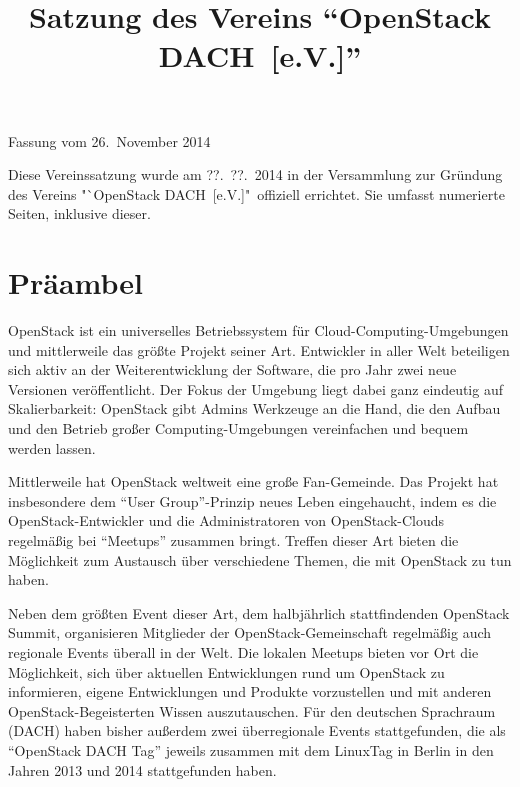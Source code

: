 \documentclass[draft]{scrartcl}
\newcommand{\VereinsName}{OpenStack DACH}
\begin{document}

\title{Satzung des Vereins "`\VereinsName\ [e.V.]"'}
\date{}
\author{}
\def\fassungsdatum{26.\ November 2014}

\begin{center}
  \LARGE \thetitle
\end{center}

\begin{flushright}
  Fassung vom \fassungsdatum
\end{flushright}

\pagestyle{scrheadings}
\clearscrheadfoot
{}

{\footnotesize Diese Vereinssatzung wurde am ??.\ ??.\ 2014 in der Versammlung
  zur Gründung des Vereins "`\VereinsName\ [e.V.]"\ offiziell errichtet. Sie
  umfasst \pageref{TotPages} numerierte Seiten, inklusive dieser.}

\bigskip

\section*{Präambel}\enlargethispage{\textheight}
\small

OpenStack ist ein universelles Betriebssystem für Cloud-Computing-Umgebungen
und mittlerweile das größte Projekt seiner Art. Entwickler in aller Welt
beteiligen sich aktiv an der Weiterentwicklung der Software, die pro Jahr
zwei neue Versionen veröffentlicht. Der Fokus der Umgebung liegt dabei ganz
eindeutig auf Skalierbarkeit: OpenStack gibt Admins Werkzeuge an die Hand,
die den Aufbau und den Betrieb großer Computing-Umgebungen vereinfachen
und bequem werden lassen.

Mittlerweile hat OpenStack weltweit eine große Fan-Gemeinde. Das Projekt hat
insbesondere dem "`User Group"'-Prinzip neues Leben eingehaucht, indem es die
OpenStack-Entwickler und die Administratoren von OpenStack-Clouds regelmäßig
bei "`Meetups"' zusammen bringt. Treffen dieser Art bieten die Möglichkeit
zum Austausch über verschiedene Themen, die mit OpenStack zu tun haben.

Neben dem größten Event dieser Art, dem halbjährlich stattfindenden OpenStack
Summit, organisieren Mitglieder der OpenStack-Gemeinschaft regelmäßig auch
regionale Events überall in der Welt. Die lokalen Meetups bieten vor Ort
die Möglichkeit, sich über aktuellen Entwicklungen rund um OpenStack zu
informieren, eigene Entwicklungen und Produkte vorzustellen und mit anderen
OpenStack-Begeisterten Wissen auszutauschen. Für den deutschen Sprachraum
(DACH) haben bisher außerdem zwei überregionale Events stattgefunden, die
als "`OpenStack DACH Tag"' jeweils zusammen mit dem LinuxTag in Berlin in
den Jahren 2013 und 2014 stattgefunden haben.
\end{document}
